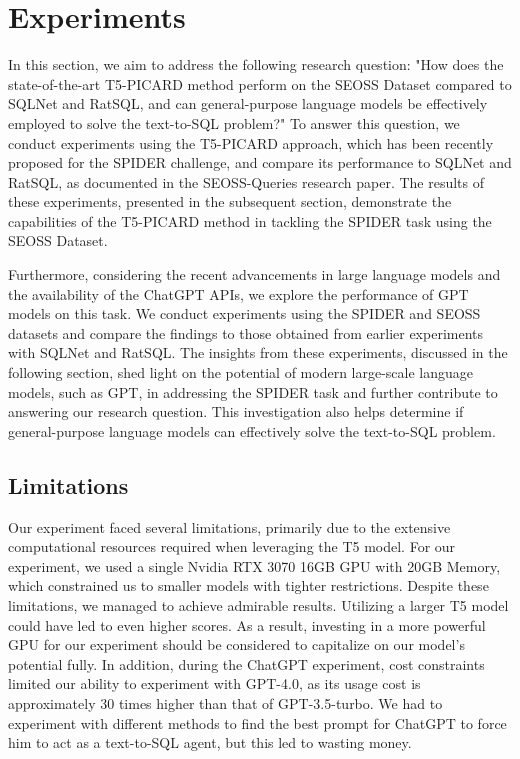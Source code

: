 \section{Experiments}

In this section, we aim to address the following research question: "How does the state-of-the-art T5-PICARD method perform on the SEOSS Dataset compared to SQLNet and RatSQL, and can general-purpose language models be effectively employed to solve the text-to-SQL problem?" To answer this question, we conduct experiments using the T5-PICARD approach, which has been recently proposed for the SPIDER challenge, and compare its performance to SQLNet and RatSQL, as documented in the SEOSS-Queries research paper\cite{TOMOVA2022108211}. The results of these experiments, presented in the subsequent section, demonstrate the capabilities of the T5-PICARD method in tackling the SPIDER task using the SEOSS Dataset.

Furthermore, considering the recent advancements in large language models and the availability of the ChatGPT APIs, we explore the performance of GPT models on this task. We conduct experiments using the SPIDER and SEOSS datasets and compare the findings to those obtained from earlier experiments with SQLNet and RatSQL. The insights from these experiments, discussed in the following section, shed light on the potential of modern large-scale language models, such as GPT, in addressing the SPIDER task and further contribute to answering our research question. This investigation also helps determine if general-purpose language models can effectively solve the text-to-SQL problem.

\subsection{Limitations}

Our experiment faced several limitations, primarily due to the extensive computational resources required when leveraging the T5 model. For our experiment, we used a single Nvidia RTX 3070 16GB GPU with 20GB Memory, which constrained us to smaller models with tighter restrictions. Despite these limitations, we managed to achieve admirable results. Utilizing a larger T5 model could have led to even higher scores. As a result, investing in a more powerful GPU for our experiment should be considered to capitalize on our model's potential fully.
In addition, during the ChatGPT experiment, cost constraints limited our ability to experiment with GPT-4.0, as its usage cost is approximately 30 times higher than that of GPT-3.5-turbo. We had to experiment with different methods to find the best prompt for ChatGPT to force him to act as a text-to-SQL agent, but this led to wasting money.

